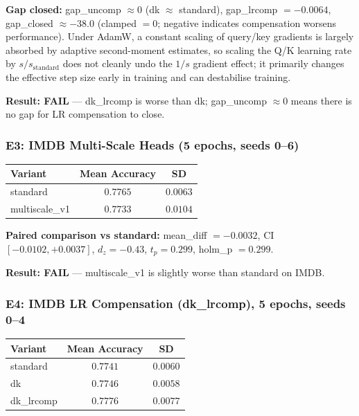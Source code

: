 \documentclass[10pt,a4paper]{article}
\begin{document}
\textbf{Gap closed:} gap\_uncomp $\approx 0$ (dk $\approx$ standard), gap\_lrcomp $= -0.0064$, gap\_closed $\approx -38.0$ (clamped $= 0$; negative indicates compensation worsens performance). Under AdamW, a constant scaling of query/key gradients is largely absorbed by adaptive second-moment estimates, so scaling the Q/K learning rate by $s/s_{\text{standard}}$ does not cleanly undo the $1/s$ gradient effect; it primarily changes the effective step size early in training and can destabilise training.

\textbf{Result: FAIL} --- dk\_lrcomp is worse than dk; gap\_uncomp $\approx 0$ means there is no gap for LR compensation to close.

\subsubsection{E3: IMDB Multi-Scale Heads (5 epochs, seeds 0--6)}

\begin{table}[h]
\centering
\begin{tabular}{lcc}
\toprule
Variant & Mean Accuracy & SD \\
\midrule
standard & $0.7765$ & $0.0063$ \\
multiscale\_v1 & $0.7733$ & $0.0104$ \\
\bottomrule
\end{tabular}
\end{table}

\textbf{Paired comparison vs standard:} mean\_diff $= -0.0032$, CI $[-0.0102, +0.0037]$, $d_z = -0.43$, $t_p = 0.299$, holm\_p $= 0.299$.

\textbf{Result: FAIL} --- multiscale\_v1 is slightly worse than standard on IMDB.

\subsubsection{E4: IMDB LR Compensation (dk\_lrcomp), 5 epochs, seeds 0--4}

\begin{table}[h]
\centering
\begin{tabular}{lcc}
\toprule
Variant & Mean Accuracy & SD \\
\midrule
standard & $0.7741$ & $0.0060$ \\
dk & $0.7746$ & $0.0058$ \\
dk\_lrcomp & $0.7776$ & $0.0077$ \\
\bottomrule
\end{tabular}
\end{table}
\end{document}
